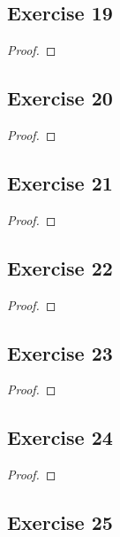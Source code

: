 \documentclass[14pt]{extarticle}
\begin{document}
\subsection{Exercise 19}

\begin{proof}

\end{proof}

\subsection{Exercise 20}

\begin{proof}

\end{proof}

\subsection{Exercise 21}

\begin{proof}

\end{proof}

\subsection{Exercise 22}

\begin{proof}

\end{proof}

\subsection{Exercise 23}

\begin{proof}

\end{proof}

\subsection{Exercise 24}

\begin{proof}

\end{proof}

\subsection{Exercise 25}
\end{document}
